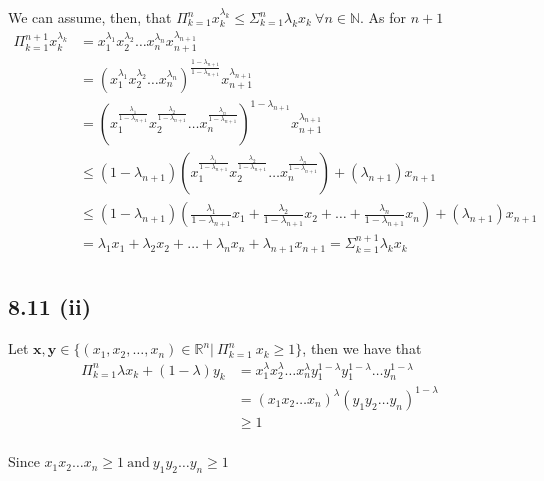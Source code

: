 \documentclass[letterpaper,12pt]{article}
\theoremstyle{definition}
\begin{document}
			We can assume, then, that $\Pi_{k=1}^n x_k^{\lambda_k} \leq \Sigma_{k=1}^n \lambda_k x_k ~\forall n \in \mathbb{N}$. As for $n+1$
			\begin{align*}
				\Pi_{k=1}^{n+1} x_k^{\lambda_k} &= x_1^{\lambda_1}x_2^{\lambda_2}\ldots x_n^{\lambda_n}x_{n+1}^{\lambda_{n+1}}\\
				&= (x_1^{\lambda_1}x_2^{\lambda_2}\ldots x_n^{\lambda_n})^{\frac{1-\lambda_{n+1}}{1-\lambda_{n+1}}}x_{n+1}^{\lambda_{n+1}}\\
				&= (x_1^{\frac{\lambda_1}{1-\lambda_{n+1}}}x_2^{\frac{\lambda_2}{1-\lambda_{n+1}}}\ldots x_n^{\frac{\lambda_n}{1-\lambda_{n+1}}})^{1-\lambda_{n+1}}x_{n+1}^{\lambda_{n+1}}\\
				&\leq (1-\lambda_{n+1})(x_1^{\frac{\lambda_1}{1-\lambda_{n+1}}}x_2^{\frac{\lambda_2}{1-\lambda_{n+1}}}\ldots x_n^{\frac{\lambda_n}{1-\lambda_{n+1}}}) + (\lambda_{n+1})x_{n+1}\\
				&\leq (1-\lambda_{n+1})({\frac{\lambda_1}{1-\lambda_{n+1}}}x_1 + {\frac{\lambda_2}{1-\lambda_{n+1}}}x_2 + \ldots + \frac{\lambda_n}{1-\lambda_{n+1}}x_n) + (\lambda_{n+1})x_{n+1}\\
				&= \lambda_1 x_1 + \lambda_2 x_2 + \ldots + \lambda_n x_n + \lambda_{n+1}x_{n+1} = \Sigma_{k=1}^{n+1} \lambda_k x_k\\
			\end{align*}
            \subsection*{8.11 (ii)}
             
            
			Let $\mathbf{x}, \mathbf{y} \in \{(x_1,x_2,\ldots,x_n) \in \mathbb{R}^n |\ \Pi_{k=1}^{n}\ x_k \geq 1\}$, then we have that
            \begin{align*}
				\Pi_{k=1}^{n}{\lambda x_k + (1-\lambda)y_k} &= x_1^\lambda x_2^\lambda \ldots x_n^\lambda y_1^{1-\lambda} y_1^{1-\lambda} \ldots y_n^{1-\lambda}\\
				&= (x_1 x_2\ldots x_n)^\lambda(y_1 y_2\ldots y_n)^{1-\lambda}\\
				&\geq 1\\ 
			\end{align*}
            
				Since $x_1 x_2\ldots x_n \geq 1 \ \mathrm{and }\ y_1 y_2\ldots y_n \geq 1$
\end{document}
